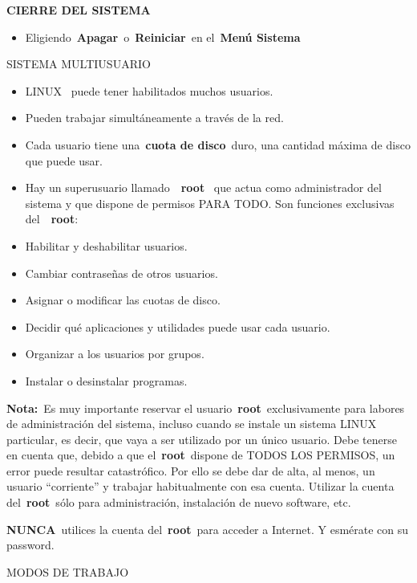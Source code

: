 \documentclass[
  jou,
  floatsintext,
  longtable,
  a4paper,
  nolmodern,
  notxfonts,
  notimes,
  12pt,
  colorlinks=true,linkcolor=blue,citecolor=blue,urlcolor=blue]{apa7}
\providecommand{\tightlist}{%
  \setlength{\itemsep}{0pt}\setlength{\parskip}{0pt}}
\begin{document}
\textbf{CIERRE DEL SISTEMA}

\begin{itemize}
\tightlist
\item
  Eligiendo~\textbf{Apagar}~o~\textbf{Reiniciar}~en el~\textbf{Menú
  Sistema}
\end{itemize}

SISTEMA MULTIUSUARIO

\begin{itemize}
\item
  LINUX~ puede tener habilitados muchos usuarios.
\item
  Pueden trabajar simultáneamente a través de la red.
\item
  Cada usuario tiene una~\textbf{cuota de disco}~duro, una cantidad
  máxima de disco que puede usar.
\item
  Hay un superusuario llamado~~\textbf{root}~ que actua como
  administrador del sistema y que dispone de permisos PARA TODO. Son
  funciones exclusivas del~~\textbf{root}:
\item
  Habilitar y deshabilitar usuarios.
\item
  Cambiar contraseñas de otros usuarios.
\item
  Asignar o modificar las cuotas de disco.
\item
  Decidir qué aplicaciones y utilidades puede usar cada usuario.
\item
  Organizar a los usuarios por grupos.
\item
  Instalar o desinstalar programas.
\end{itemize}

\textbf{Nota:}~Es muy importante reservar el
usuario~\textbf{root}~exclusivamente para labores de administración del
sistema, incluso cuando se instale un sistema LINUX particular, es
decir, que vaya a ser utilizado por un único usuario. Debe tenerse en
cuenta que, debido a que el~\textbf{root}~dispone de TODOS LOS PERMISOS,
un error puede resultar catastrófico. Por ello se debe dar de alta, al
menos, un usuario ``corriente'' y trabajar habitualmente con esa cuenta.
Utilizar la cuenta del~\textbf{root}~sólo para administración,
instalación de nuevo software, etc.

\textbf{NUNCA}~utilices la cuenta del~\textbf{root}~para acceder a
Internet. Y esmérate con su password.

MODOS DE TRABAJO
\end{document}
